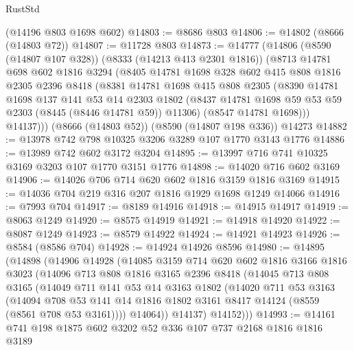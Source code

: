 \begin{lexlean}{RustStd}
\begin{coremodule}
    (@14196 @803 @1698 @602)
@14803 := @8686 @803
@14806 := @14802 (@8666 (@14803 @72))
@14807 := @11728 @803
@14873 := @14777
    (@14806
      (@8590 (@14807 @107 @328))
      (@8333 (@14213 @413 @2301 @1816))
      (@8713
        @14781
        @698
        @602
        @1816
        @3294
        (@8405
          @14781
          @1698
          @328
          @602
          @415
          @808
          @1816
          @2305
          @2396
          @8418
          (@8381
            @14781
            @1698
            @415
            @808
            @2305
            (@8390
              @14781
              @1698
              @137
              @141
              @53
              @14
              @2303
              @1802
              (@8437 @14781 @1698 @59 @53 @59 @2303 (@8445 (@8446 @14781 @59)) @11306)
              (@8547 @14781 @1698)))
          @14137)))
    (@8666 (@14803 @52))
    (@8590 (@14807 @198 @336))
    @14273
@14882 := @13978 @742 @798 @10325 @3206 @3289 @107 @1770 @3143 @1776
@14886 := @13989 @742 @602 @3172 @3204
@14895 := @13997 @716 @741 @10325 @3169 @3203 @107 @1770 @3151 @1776
@14898 := @14020 @716 @602 @3169
@14906 := @14026 @706 @714 @620 @602 @1816 @3159 @1816 @3169
@14915 := @14036 @704 @219 @316 @207 @1816 @1929 @1698 @1249 @14066
@14916 := @7993 @704
@14917 := @8189 @14916
@14918 := @14915 @14917
@14919 := @8063 @1249
@14920 := @8575 @14919
@14921 := @14918 @14920
@14922 := @8087 @1249
@14923 := @8579 @14922
@14924 := @14921 @14923
@14926 := @8584 (@8586 @704)
@14928 := @14924 @14926 @8596
@14980 := @14895
    (@14898
      (@14906
        @14928
        (@14085
          @3159
          @714
          @620
          @602
          @1816
          @3166
          @1816
          @3023
          (@14096
            @713
            @808
            @1816
            @3165
            @2396
            @8418
            (@14045
              @713
              @808
              @3165
              (@14049
                @711
                @141
                @53
                @14
                @3163
                @1802
                (@14020
                  @711
                  @53
                  @3163
                  (@14094
                    @708
                    @53
                    @141
                    @14
                    @1816
                    @1802
                    @3161
                    @8417
                    @14124
                    (@8559 (@8561 @708 @53 @3161))))
                @14064))
            @14137)
          @14152)))
@14993 := @14161 @741 @198 @1875 @602 @3202 @52 @336 @107 @737 @2168 @1816 @1816 @3189

\end{coremodule}
\end{lexlean}
